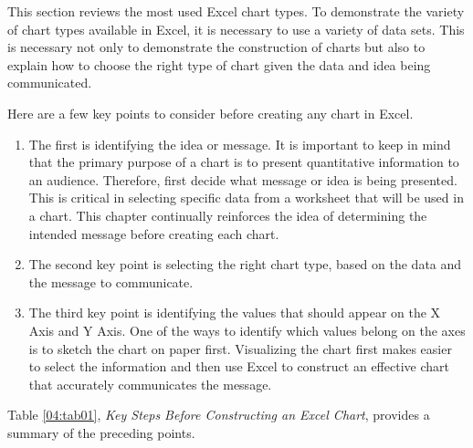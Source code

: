 This section reviews the most used Excel chart types. To demonstrate the variety of chart types available in Excel, it is necessary to use a variety of data sets. This is necessary not only to demonstrate the construction of charts but also to explain how to choose the right type of chart given the data and idea being communicated.

Here are a few key points to consider before creating any chart in Excel.

\begin{enumerate}
	\item The first is identifying the idea or message. It is important to keep in mind that the primary purpose of a chart is to present quantitative information to an audience. Therefore, first decide what message or idea is being presented. This is critical in selecting specific data from a worksheet that will be used in a chart. This chapter continually reinforces the idea of determining the intended message before creating each chart.
	\item The second key point is selecting the right chart type, based on the data and the message to communicate.
	\item The third key point is identifying the values that should appear on the X Axis and Y Axis. One of the ways to identify which values belong on the axes is to sketch the chart on paper first. Visualizing the chart first makes easier to select the information and then use Excel to construct an effective chart that accurately communicates the message. 
\end{enumerate}

Table \ref{04:tab01}, \textit{Key Steps Before Constructing an Excel Chart}, provides a summary of the preceding points.

